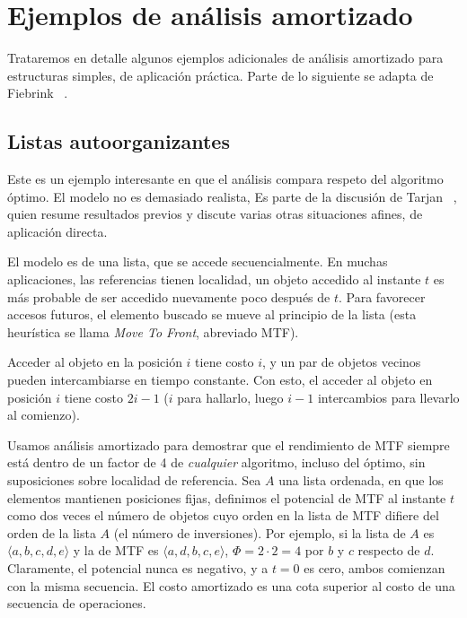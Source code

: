 

\chapter{Ejemplos de análisis amortizado}
\label{cha:ejemplos-amortizado}

  Trataremos en detalle algunos ejemplos adicionales
  de análisis amortizado para estructuras simples,
  de aplicación práctica.
  Parte de lo siguiente se adapta de Fiebrink~%
    \cite{fiebrink07:_amortized_analysis_explained}.

\section{Listas autoorganizantes}
\label{sec:list-autoorganizantes}

  Este es un ejemplo interesante
  en que el análisis compara respeto del algoritmo óptimo.
  El modelo no es demasiado realista,
  Es parte de la discusión de Tarjan~%
    \cite{sleator85:_amort_effic_list_updat_pagin_rules},
  quien resume resultados previos
  y discute varias otras situaciones afines,
  de aplicación directa.

  El modelo es de una lista,
  que se accede secuencialmente.
  En muchas aplicaciones,
  las referencias tienen localidad,
  un objeto accedido al instante \(t\)
  es más probable de ser accedido nuevamente poco después de \(t\).
  Para favorecer accesos futuros,
  el elemento buscado se mueve al principio de la lista
  (esta heurística se llama \emph{\foreignlanguage{english}{Move To Front}},
   abreviado MTF).

  Acceder al objeto en la posición \(i\) tiene costo \(i\),
  y un par de objetos vecinos pueden intercambiarse en tiempo constante.
  Con esto,
  el acceder al objeto en posición \(i\) tiene costo \(2 i - 1\)
  (\(i\) para hallarlo,
   luego \(i - 1\) intercambios para llevarlo al comienzo).

  Usamos análisis amortizado para demostrar que el rendimiento de MTF
  siempre está dentro de un factor de \num{4} de \emph{cualquier} algoritmo,
  incluso del óptimo,
  sin suposiciones sobre localidad de referencia.
  Sea \(A\) una lista ordenada,
  en que los elementos mantienen posiciones fijas,
  definimos el potencial de MTF al instante \(t\)
  como dos veces el número de objetos cuyo orden en la lista de MTF
  difiere del orden de la lista \(A\)
  (el número de inversiones).
  Por ejemplo,
  si la lista de \(A\) es \(\langle a, b, c, d, e \rangle\)
  y la de MTF es \(\langle a, d, b, c, e \rangle\),
  \(\Phi = 2 \cdot 2 = 4\)
  por \(b\) y \(c\) respecto de \(d\).
  Claramente,
  el potencial nunca es negativo,
  y a \(t = 0\) es cero,
  ambos comienzan con la misma secuencia.
  El costo amortizado es una cota superior
  al costo de una secuencia de operaciones.

